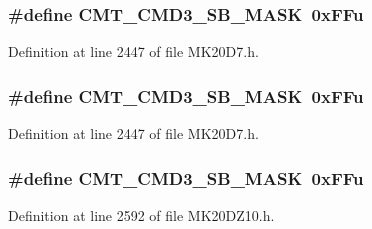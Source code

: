 \subsubsection[{\texorpdfstring{C\+M\+T\+\_\+\+C\+M\+D3\+\_\+\+S\+B\+\_\+\+M\+A\+SK}{CMT_CMD3_SB_MASK}}]{\setlength{\rightskip}{0pt plus 5cm}\#define C\+M\+T\+\_\+\+C\+M\+D3\+\_\+\+S\+B\+\_\+\+M\+A\+SK~0x\+F\+Fu}\hypertarget{group___c_m_t___register___masks_ga0ee814da2957c935fad8b236d52b22f5}{}\label{group___c_m_t___register___masks_ga0ee814da2957c935fad8b236d52b22f5}


Definition at line 2447 of file M\+K20\+D7.\+h.

\subsubsection[{\texorpdfstring{C\+M\+T\+\_\+\+C\+M\+D3\+\_\+\+S\+B\+\_\+\+M\+A\+SK}{CMT_CMD3_SB_MASK}}]{\setlength{\rightskip}{0pt plus 5cm}\#define C\+M\+T\+\_\+\+C\+M\+D3\+\_\+\+S\+B\+\_\+\+M\+A\+SK~0x\+F\+Fu}\hypertarget{group___c_m_t___register___masks_ga0ee814da2957c935fad8b236d52b22f5}{}\label{group___c_m_t___register___masks_ga0ee814da2957c935fad8b236d52b22f5}


Definition at line 2447 of file M\+K20\+D7.\+h.

\subsubsection[{\texorpdfstring{C\+M\+T\+\_\+\+C\+M\+D3\+\_\+\+S\+B\+\_\+\+M\+A\+SK}{CMT_CMD3_SB_MASK}}]{\setlength{\rightskip}{0pt plus 5cm}\#define C\+M\+T\+\_\+\+C\+M\+D3\+\_\+\+S\+B\+\_\+\+M\+A\+SK~0x\+F\+Fu}\hypertarget{group___c_m_t___register___masks_ga0ee814da2957c935fad8b236d52b22f5}{}\label{group___c_m_t___register___masks_ga0ee814da2957c935fad8b236d52b22f5}


Definition at line 2592 of file M\+K20\+D\+Z10.\+h.


